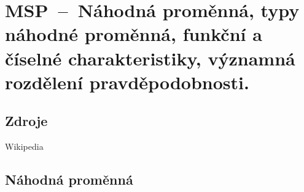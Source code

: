 

\graphicspath{{msp/nahodna_promenna/figures}}


\chapter{MSP~--~Náhodná proměnná, typy náhodné proměnná, funkční a číselné charakteristiky, významná rozdělení pravděpodobnosti.}


\section{Zdroje}

\begin{compactitem}
    \item {}
    \item {}
    \item Wikipedia
\end{compactitem}


\section{Náhodná proměnná}

